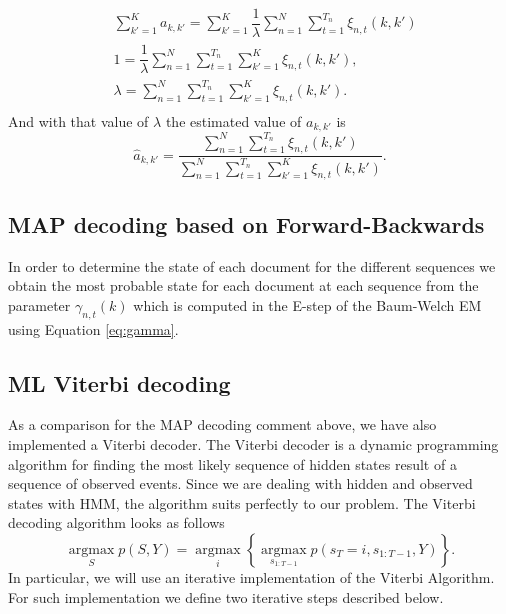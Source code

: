 \documentclass[12pt]{article}
\begin{document}
\begin{equation}
\begin{split}
& \sum \limits_{k'=1}^{K}a_{k,k'} = \sum \limits_{k'=1}^{K} \dfrac{1}{\lambda} \sum \limits_{n=1}^{N}\sum _ { t = 1 } ^ { T _ { n } } \xi_{n,t}(k,k')\\
& 1 = \dfrac{1}{\lambda} \sum \limits_{n=1}^{N}\sum _ { t = 1 } ^ { T _ { n } }\sum \limits_{k'=1}^{K}\xi_{n,t}(k,k'),\\
& \lambda = \sum \limits_{n=1}^{N}\sum \limits_{ t = 1 } ^ { T _ { n }}\sum \limits_{k'=1}^{K}\xi_{n,t}(k,k').\\
\end{split}
\end{equation}
And with that value of $\lambda$ the estimated value of $a_{k,k'}$ is
\begin{equation}
\widehat{a}_{k,k'} = \dfrac{\sum \limits_{n=1}^{N} \sum \limits_ { t = 1 } ^ { T _ { n } }\xi_{n,t}(k,k')}{\sum \limits_{n=1}^{N}\sum \limits_ { t = 1 } ^ { T _ { n } }\sum \limits_{k'=1}^{K}\xi_{n,t}(k,k')}.
\end{equation}


\subsection{MAP decoding based on Forward-Backwards}
In order to determine the state of each document for the different sequences we obtain the most probable state for each document at each sequence from the parameter $\gamma _ { n , t } ( k )$ which is computed in the E-step of the Baum-Welch EM using Equation \ref{eq:gamma}.


\subsection{ML Viterbi decoding}
As a comparison for the MAP decoding comment above, we have also implemented a Viterbi decoder. The Viterbi decoder is a dynamic programming algorithm for finding the most likely sequence of hidden states result of a sequence of observed events. Since we are dealing with hidden and observed states with HMM, the algorithm suits perfectly to our problem. The Viterbi decoding algorithm looks as follows
\begin{equation}
\underset { S } { \operatorname { argmax } } p ( S , Y ) = \underset { i } { \operatorname { argmax } } \left\{ \underset { s _ { 1 : T - 1 } } { \operatorname { argmax } } p \left( s _ { T } = i , s _ { 1 : T - 1 } , Y \right) \right\}.
\end{equation}
In particular, we will use an iterative implementation of the Viterbi Algorithm. For such implementation we define two iterative steps described below.
\end{document}

